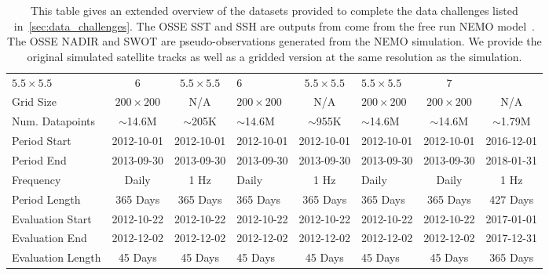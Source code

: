 \begin{landscape}
\begin{table}[ht]
{\begin{tabular}{lcclclcc}
$5.5\times 5.5$ &
$6$ &
$5.5\times 5.5$ &
$6$ &
$5.5\times 5.5$ &
$5.5\times 5.5$ &
$7$ \\
Grid Size &
$200\times 200$ & 
N/A &
$200\times 200$ & 
N/A &
$200\times 200$ & 
$200\times 200$ & 
N/A \\
Num. Datapoints &
$\sim$14.6M & 
$\sim$205K & 
$\sim$14.6M & 
$\sim$955K & 
$\sim$14.6M & 
$\sim$14.6M & 
$\sim$1.79M \\ \midrule
Period Start & 
2012-10-01 & 2012-10-01 & 2012-10-01 & 2012-10-01 & 
2012-10-01 & 2012-10-01 & 2016-12-01 \\
Period End & 
2013-09-30 & 2013-09-30 & 2013-09-30 & 2013-09-30 & 
2013-09-30 & 2013-09-30 & 2018-01-31 \\
Frequency  & 
Daily & 1 Hz  & Daily & 1 Hz  & Daily & Daily & 1 Hz \\ 
Period Length & 365 Days & 365 Days & 365 Days &
365 Days & 365 Days & 365 Days & 427 Days \\
\midrule
Evaluation Start & 
2012-10-22 & 2012-10-22 & 2012-10-22 & 2012-10-22 & 
2012-10-22 & 2012-10-22 & 2017-01-01 \\
Evaluation End & 
2012-12-02 & 2012-12-02 & 2012-12-02 & 2012-12-02 & 
2012-12-02 & 2012-12-02 & 2017-12-31 \\ 
Evaluation Length & 45 Days & 45 Days & 45 Days &
45 Days & 45 Days & 45 Days & 365 Days \\
\bottomrule
\end{tabular}}
\caption{This table gives an extended overview of the datasets provided to complete the data challenges listed in~\ref{sec:data_challenges}. The OSSE SST and SSH are outputs from come from the free run NEMO model~\citep{NEMOAJAYI2020}. The OSSE NADIR and SWOT are pseudo-observations generated from the NEMO simulation. We provide the original simulated satellite tracks as well as a gridded version at the same resolution as the simulation. 
}
\label{c5tb:datasetsmega}
\end{table}
\end{landscape}


